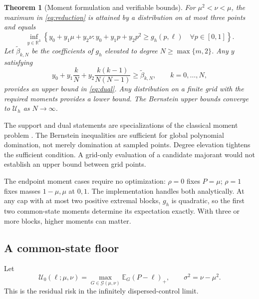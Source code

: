 \documentclass[11pt]{article}
\newtheorem{theorem}{Theorem}
\theoremstyle{definition}\newtheorem{definition}[theorem]{Definition}
\newcommand{\E}{\mathbb E}
\newcommand{\G}{\mathcal G}
\newcommand{\U}{\mathcal U}
\newcommand{\R}{\mathbb R}
\newcommand{\pos}[1]{\left(#1\right)_+}
\begin{document}
\begin{theorem}[Moment formulation and verifiable bounds]\label{thm:moments}
For \(\mu^2<\nu<\mu\), the maximum in \eqref{eq:reduction} is attained by a distribution on at most three points and equals
\begin{equation}
 \inf_{y\in\R^3}\left\{y_0+y_1\mu+y_2\nu:
 y_0+y_1p+y_2p^2\geq g_h(p,\ell)\quad\forall p\in[0,1]\right\}.
 \label{eq:dual}
\end{equation}
Let \(\widetilde\beta_{k,N}\) be the coefficients of \(g_h\) elevated to degree \(N\geq\max\{m,2\}\). Any \(y\) satisfying
\begin{equation}
 y_0+y_1\frac{k}{N}+y_2\frac{k(k-1)}{N(N-1)}
 \geq\widetilde\beta_{k,N},\qquad k=0,\ldots,N,
 \label{eq:bernconstraint}
\end{equation}
provides an upper bound in \eqref{eq:dual}. Any distribution on a finite grid with the required moments provides a lower bound. The Bernstein upper bounds converge to \(\U_h\) as \(N\to\infty\).
\end{theorem}
The support and dual statements are specializations of the classical moment problem \citep{bertsimas2005}. The Bernstein inequalities are sufficient for global polynomial domination, not merely domination at sampled points. Degree elevation tightens the sufficient condition. A grid-only evaluation of a candidate majorant would not establish an upper bound between grid points.

The endpoint moment cases require no optimization: \(\rho=0\) fixes \(P=\mu\); \(\rho=1\) fixes masses \(1-\mu,\mu\) at \(0,1\). The implementation handles both analytically. At any cap with at most two positive extremal blocks, \(g_h\) is quadratic, so the first two common-state moments determine its expectation exactly. With three or more blocks, higher moments can matter.

\subsection{A common-state floor}
Let
\begin{equation}
 \U_0(\ell;\mu,\nu)=\max_{G\in\G(\mu,\nu)}\E_G\pos{P-\ell},\qquad
 \sigma^2=\nu-\mu^2.
 \label{eq:floor}
\end{equation}
This is the residual risk in the infinitely dispersed-control limit.
\end{document}
